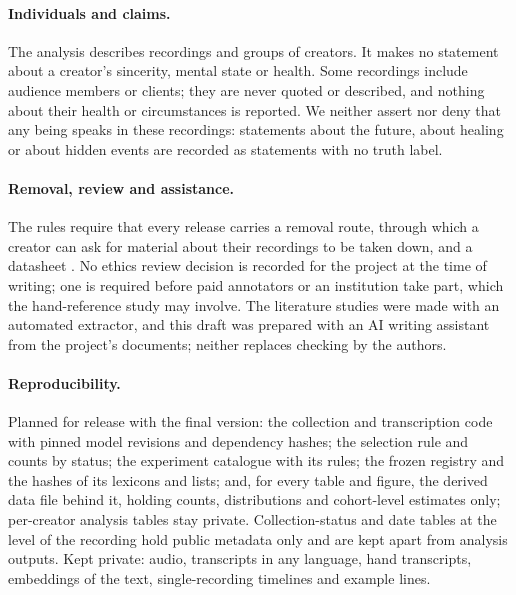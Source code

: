 \documentclass[letterpaper]{article} %
\begin{document}
\paragraph{Individuals and claims.} The analysis describes recordings and groups of creators. It makes no statement about a creator's sincerity, mental state or health. Some recordings include audience members or clients; they are never quoted or described, and nothing about their health or circumstances is reported. We neither assert nor deny that any being speaks in these recordings: statements about the future, about healing or about hidden events are recorded as statements with no truth label.

\paragraph{Removal, review and assistance.} The rules require that every release carries a removal route, through which a creator can ask for material about their recordings to be taken down, and a datasheet \cite{gebru2018datasheets}. No ethics review decision is recorded for the project at the time of writing; one is required before paid annotators or an institution take part, which the hand-reference study may involve. The literature studies were made with an automated extractor, and this draft was prepared with an AI writing assistant from the project's documents; neither replaces checking by the authors.

\paragraph{Reproducibility.} Planned for release with the final version: the collection and transcription code with pinned model revisions and dependency hashes; the selection rule and counts by status; the experiment catalogue with its rules; the frozen registry and the hashes of its lexicons and lists; and, for every table and figure, the derived data file behind it, holding counts, distributions and cohort-level estimates only; per-creator analysis tables stay private. Collection-status and date tables at the level of the recording hold public metadata only and are kept apart from analysis outputs. Kept private: audio, transcripts in any language, hand transcripts, embeddings of the text, single-recording timelines and example lines.



\appendix
\renewcommand{\thefigure}{A\arabic{figure}}
\setcounter{figure}{0}
\end{document}
